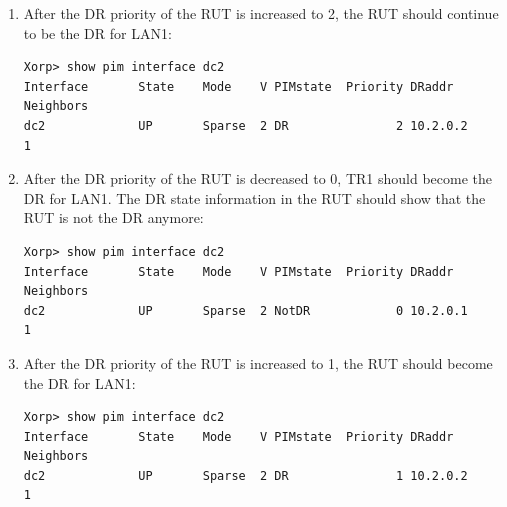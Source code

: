 \documentclass[11pt]{report}
\begin{document}
\begin{enumerate}
  \item After the DR priority of the RUT is increased to 2, the RUT should
        continue to be the DR for LAN1:

\begin{verbatim}
Xorp> show pim interface dc2
Interface       State    Mode    V PIMstate  Priority DRaddr     Neighbors
dc2             UP       Sparse  2 DR               2 10.2.0.2           1
\end{verbatim}

  \item After the DR priority of the RUT is decreased to 0, TR1 should become
        the DR for LAN1. The DR state information in the RUT should show that
        the RUT is not the DR anymore:

\begin{verbatim}
Xorp> show pim interface dc2
Interface       State    Mode    V PIMstate  Priority DRaddr     Neighbors
dc2             UP       Sparse  2 NotDR            0 10.2.0.1           1
\end{verbatim}

  \item After the DR priority of the RUT is increased to 1, the RUT should
        become the DR for LAN1:

\begin{verbatim}
Xorp> show pim interface dc2
Interface       State    Mode    V PIMstate  Priority DRaddr      Neighbors
dc2             UP       Sparse  2 DR               1 10.2.0.2            1
\end{verbatim}

\end{enumerate}

\end{document}
